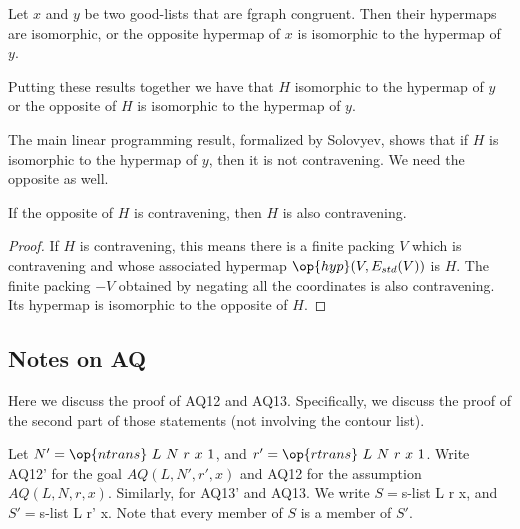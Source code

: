 \begin{lemma}
Let $x$ and $y$ be two good-lists that are fgraph congruent.
Then their hypermaps are isomorphic, or the opposite hypermap of $x$
is isomorphic to the hypermap of $y$.
\end{lemma} 

Putting these results together we have that $H$ isomorphic to the
hypermap of $y$ or the opposite of $H$ is isomorphic to the hypermap
of $y$.

The main linear programming result, formalized by Solovyev, shows
that if $H$ is isomorphic to the hypermap of $y$, then it is not
contravening.  We need the opposite as well.

\begin{lemma}
 If the opposite of $H$ is contravening, then  $H$
is also contravening.  
\end{lemma} 

\begin{proof}
  If $H$ is contravening, this means there is a finite packing $V$
  which is contravening and whose associated hypermap
  $\op{hyp}(V,E_{std}(V))$ is $H$.  The finite packing $-V$ obtained
  by negating all the coordinates is also contravening.  Its hypermap
  is isomorphic to the opposite of $H$.
\end{proof}

\newpage
\subsection{Notes on AQ}

Here we discuss the proof of AQ12 and AQ13.
Specifically, we discuss the proof of the second part of those statements (not
involving the contour list).

Let $N' = \op{ntrans}~ L~N~r~x~1$, and $r' = \op{rtrans}~ L ~N~r~x~1$.
Write AQ12' for the goal $AQ(L,N',r',x)$ and AQ12 for the assumption $AQ(L,N,r,x)$.
Similarly, for AQ13' and AQ13.
We write $S = $s-list L r x, and $S' = $s-list L r' x. Note that every member of $S$
is a member of $S'$.

